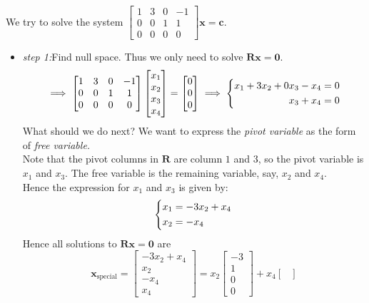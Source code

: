 \begin{example}
We try to solve the system $\begin{bmatrix}
1&3&0&-1\\0&0&1&1\\0&0&0&0
\end{bmatrix}\bm x = \bm c$.
\begin{itemize}
\item
\emph{step 1:}Find null space. Thus we only need to solve $\bm{Rx} = \bm 0$.
\[
\implies \begin{bmatrix}
1&3&0&-1\\0&0&1&1\\0&0&0&0
\end{bmatrix}\begin{bmatrix}
x_1\\x_2\\x_3\\x_4
\end{bmatrix} = \begin{bmatrix}
0\\0\\0
\end{bmatrix}\implies \left\{\begin{rgathered}
x_1+3x_2+0x_3-x_4=0\\
x_3+x_4=0
\end{rgathered}\right.
\]
What should we do next? We want to express the \emph{pivot variable} as the form of \emph{free variable.}\\
Note that the pivot columns in $\bm R$ are column $1$ and $3$, so the pivot variable is $x_1$ and $x_3$. The free variable is the remaining variable, say, $x_2$ and $x_4$.\\
Hence the expression for $x_1$ and $x_3$ is given by:
\[
\left\{\begin{lgathered}
x_1=-3x_2+x_4\\
x_2=-x_4
\end{lgathered}\right.
\]
Hence all solutions to $\bm{Rx} = \bm 0$ are
\[
\bm x_{\text{special}} = \begin{bmatrix}
-3x_2+x_4\\x_2\\-x_4\\x_4
\end{bmatrix} = x_2\begin{bmatrix}
-3\\1\\0\\0
\end{bmatrix} + x_4\begin{bmatrix}

\end{bmatrix}\]
\end{itemize}
\end{example}

